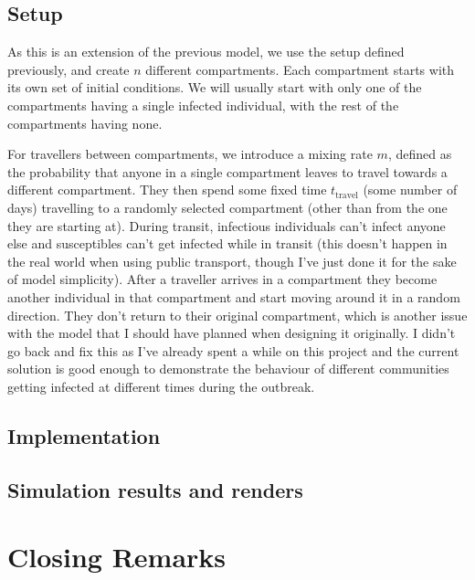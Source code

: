 \documentclass[11pt]{article}
\begin{document}
\subsection*{Setup}
As this is an extension of the previous model, we use the setup defined previously, and create $n$ different compartments. Each compartment starts with its own set of initial conditions. We will usually start with only one of the compartments having a single infected individual, with the rest of the compartments having none.

For travellers between compartments, we introduce a mixing rate $m$, defined as the probability that anyone in a single compartment leaves to travel towards a different compartment. They then spend some fixed time $t_{\text{travel}}$ (some number of days) travelling to a randomly selected compartment (other than from the one they are starting at). During transit, infectious individuals can't infect anyone else and susceptibles can't get infected while in transit (this doesn't happen in the real world when using public transport, though I've just done it for the sake of model simplicity). After a traveller arrives in a compartment they become another individual in that compartment and start moving around it in a random direction. They don't return to their original compartment, which is another issue with the model that I should have planned when designing it originally. I didn't go back and fix this as I've already spent a while on this project and the current solution is good enough to demonstrate the behaviour of different communities getting infected at different times during the outbreak.

\subsection*{Implementation}

\subsection*{Simulation results and renders}


\section*{Closing Remarks}
\end{document}
